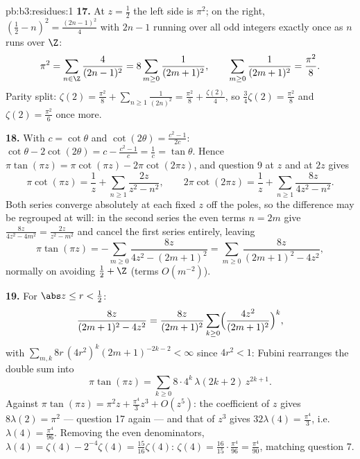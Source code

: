\begin{solution}{pb:b3:residues:1}
\textbf{17.} At $z = \frac12$ the left side is $\pi^2$; on
the right, $(\frac12 - n)^2 = \frac{(2n-1)^2}4$ with $2n -
1$ running over all odd integers exactly once as $n$ runs
over $\Z$:
\[
\pi^2 = \sum_{n\in\Z}\frac{4}{(2n-1)^2}
= 8\sum_{m\geq0}\frac1{(2m+1)^2},
\qquad
\sum_{m\geq0}\frac1{(2m+1)^2} = \frac{\pi^2}8 .
\]
Parity split: $\zeta(2) = \frac{\pi^2}8 +
\sum_{n\geq1}\frac1{(2n)^2} = \frac{\pi^2}8 +
\frac{\zeta(2)}4$, so $\frac34\zeta(2) = \frac{\pi^2}8$ and
$\zeta(2) = \frac{\pi^2}6$ once more.

\textbf{18.} With $c = \cot\theta$ and $\cot(2\theta) =
\frac{c^2-1}{2c}$: $\cot\theta - 2\cot(2\theta) = c -
\frac{c^2-1}c = \frac1c = \tan\theta$. Hence $\pi\tan(\pi z)
= \pi\cot(\pi z) - 2\pi\cot(2\pi z)$, and question 9 at $z$
and at $2z$ gives
\[
\pi\cot(\pi z) = \frac1z +
\sum_{n\geq1}\frac{2z}{z^2 - n^2},
\qquad
2\pi\cot(2\pi z) = \frac1z +
\sum_{n\geq1}\frac{8z}{4z^2 - n^2} .
\]
Both series converge absolutely at each fixed $z$ off the
poles, so the difference may be regrouped at will: in the
second series the even terms $n = 2m$ give $\frac{8z}{4z^2 -
4m^2} = \frac{2z}{z^2 - m^2}$ and cancel the first series
entirely, leaving
\[
\pi\tan(\pi z) = -\sum_{m\geq0}\frac{8z}{4z^2 - (2m+1)^2}
= \sum_{m\geq0}\frac{8z}{(2m+1)^2 - 4z^2} ,
\]
normally on  avoiding $\frac12 + \Z$ (terms
$O(m^{-2})$).

\textbf{19.} For $\abs z \leq r < \frac12$:
\[
\frac{8z}{(2m+1)^2 - 4z^2} = \frac{8z}{(2m+1)^2}
\sum_{k\geq0}\Bigl(\frac{4z^2}{(2m+1)^2}\Bigr)^{k},
\]
with $\sum_{m,k}8r\,(4r^2)^k(2m+1)^{-2k-2} < \infty$ since
$4r^2 < 1$: Fubini rearranges the double sum into
\[
\pi\tan(\pi z) =
\sum_{k\geq0}8\cdot4^k\,\lambda(2k+2)\,z^{2k+1} .
\]
Against $\pi\tan(\pi z) = \pi^2z + \frac{\pi^4}3z^3 +
O(z^5)$: the coefficient of $z$ gives $8\lambda(2) = \pi^2$
--- question 17 again --- and that of $z^3$ gives
$32\lambda(4) = \frac{\pi^4}3$, i.e.\ $\lambda(4) =
\frac{\pi^4}{96}$. Removing the even denominators,
$\lambda(4) = \zeta(4) - 2^{-4}\zeta(4) =
\frac{15}{16}\zeta(4)$: $\zeta(4) = \frac{16}{15}\cdot
\frac{\pi^4}{96} = \frac{\pi^4}{90}$, matching question 7.


\end{solution}
